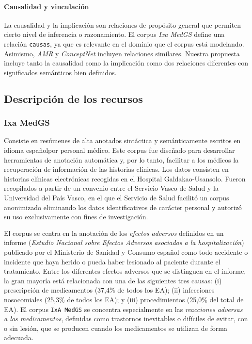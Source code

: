 \paragraph{Causalidad y vinculación}

La causalidad y la implicación son relaciones de propósito general que permiten cierto nivel de inferencia o razonamiento. El corpus \textit{Ixa MedGS} define una relación \texttt{causas}, ya que es relevante en el dominio que el corpus está modelando. Asimismo, \textit{AMR} y \textit{ConceptNet} incluyen relaciones similares. Nuestra propuesta incluye tanto la causalidad como la implicación como dos relaciones diferentes con significados semánticos bien definidos.

\subsection{Descripción de los recursos}

\subsubsection*{Ixa MedGS}

Consiste en resúmenes de alta anotados sintáctica y semánticamente escritos en idioma españolpor personal médico.
Este corpus fue diseñado para desarrollar herramientas de anotación automática y, por lo tanto, facilitar a los médicos la recuperación de información de las historias clínicas.
Los datos consisten en historias clínicas electrónicas recogidas en el Hospital Galdakao-Usansolo.
Fueron recopilados a partir de un convenio entre el Servicio Vasco de Salud y la Universidad del País Vasco, en el que el Servicio de Salud facilitó un corpus anonimizado eliminando los datos identificativos de carácter personal y autorizó su uso exclusivamente con fines de investigación.

El corpus se centra en la anotación de los \textit{efectos adversos} definidos en un informe (\textit{Estudio Nacional sobre Efectos Adversos asociados a la hospitalización}) publicado por el Ministerio de Sanidad y Consumo español como todo accidente o incidente que haya herido o pueda haber lesionado al paciente durante el tratamiento.
Entre los diferentes efectos adversos que se distinguen en el informe, la gran mayoría está relacionada con una de las siguientes tres causas: (i) prescripción de medicamentos (37,4\% de todos los EA); (ii) infecciones nosocomiales (25,3\% de todos los EA); y (iii) procedimientos (25,0\% del total de EA).
El corpus \texttt{IxA MedGS} se concentra especialmente en las \textit{reacciones adversas a los medicamentos}, definidas como trastornos inevitables o difíciles de evitar, con o sin lesión, que se producen cuando los medicamentos se utilizan de forma adecuada.

